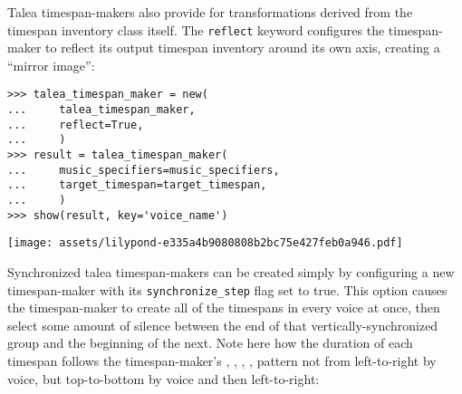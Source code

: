 \noindent Talea timespan-makers also provide for transformations derived from
the timespan inventory class itself. The \texttt{reflect} keyword configures
the timespan-maker to reflect its output timespan inventory around its own
axis, creating a \enquote{mirror image}:

\begin{comment}
<abjad>
talea_timespan_maker = new(
    talea_timespan_maker,
    reflect=True,
    )
result = talea_timespan_maker(
    music_specifiers=music_specifiers,
    target_timespan=target_timespan,
    )
show(result, key='voice_name')
</abjad>
\end{comment}

\begin{abjadbookoutput}
\begin{singlespacing}
\vspace{-0.5\baselineskip}
\begin{verbatim}
>>> talea_timespan_maker = new(
...     talea_timespan_maker,
...     reflect=True,
...     )
>>> result = talea_timespan_maker(
...     music_specifiers=music_specifiers,
...     target_timespan=target_timespan,
...     )
>>> show(result, key='voice_name')
\end{verbatim}
\noindent\texttt{[image: assets/lilypond-e335a4b9080808b2bc75e427feb0a946.pdf]}
\end{singlespacing}
\end{abjadbookoutput}

\noindent Synchronized talea timespan-makers can be created simply by
configuring a new timespan-maker with its \texttt{synchronize\_step} flag set
to true. This option causes the timespan-maker to create all of the timespans
in every voice at once, then select some amount of silence between the end of
that vertically-synchronized group and the beginning of the next. Note here how
the duration of each timespan follows the timespan-maker's ,
, , ,  pattern not from
left-to-right by voice, but top-to-bottom by voice and then left-to-right:

\begin{comment}
<abjad>
synchronized_talea_timespan_maker = consort.TaleaTimespanMaker(
    playing_talea=rhythmmakertools.Talea(
        counts=(1, 2, 3, 4, 5),
        denominator=8,
        ),
    silence_talea=rhythmmakertools.Talea(
        counts=(4, 7),
        denominator=8,
        ),
    synchronize_step=True,
    )
result = synchronized_talea_timespan_maker(
    music_specifiers=music_specifiers,
    target_timespan=target_timespan,
    )
show(result, key='voice_name')
</abjad>
\end{comment}

